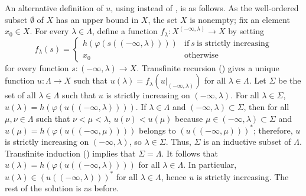\documentclass{article}
\begin{document}
\begin{solution}[\ref{exe:k8tmok20}]
  An alternative definition of \(u\), using 
  instead of , is as follows.  As the well-ordered
  subset \(\emptyset\) of \(X\) has an upper bound in \(X\), the set
  \(X\) is nonempty; fix an element \(x_0 \in X\).  For every
  \(\lambda \in \Lambda\), define a function
  \(f_\lambda : X^{(-\infty, \lambda)} \to X\) by setting
  \begin{displaymath}
    f_\lambda(s) =
    \begin{cases}
      h(\varphi(s((-\infty, \lambda))))
      & \text{if} ~ s ~ \text{is strictly increasing} \\
      x_0
      &
        \text{otherwise}
    \end{cases}
  \end{displaymath}
  for every function \(s : (-\infty, \lambda) \to X\).  Transfinite
  recursion () gives a unique function
  \(u : \Lambda \to X\) such that
  \(u(\lambda) = f_\lambda(u \vert_{(-\infty, \lambda)})\) for all
  \(\lambda \in \Lambda\).  Let \(\Sigma\) be the set of all
  \(\lambda \in \Lambda\) such that \(u\) is strictly increasing on
  \((-\infty, \lambda)\).  For all \(\lambda \in \Sigma\),
  \(u(\lambda) = h(\varphi(u((-\infty, \lambda))))\).  If
  \(\lambda \in \Lambda\) and \((-\infty, \lambda) \subset \Sigma\),
  then for all \(\mu, \nu \in \Lambda\) such that
  \(\nu < \mu < \lambda\), \(u(\nu) < u(\mu)\) because
  \(\mu \in (-\infty, \lambda) \subset \Sigma\) and
  \(u(\mu) = h(\varphi(u((-\infty, \mu))))\) belongs to
  \((u((-\infty, \mu)))^*\); therefore, \(u\) is strictly increasing
  on \((-\infty, \lambda)\), so \(\lambda \in \Sigma\).  Thus,
  \(\Sigma\) is an inductive subset of \(\Lambda\).  Transfinite
  induction () implies that \(\Sigma = \Lambda\).
  It follows that \(u(\lambda) = h(\varphi(u((-\infty, \lambda))))\)
  for all \(\lambda \in \Lambda\).  In particular,
  \(u(\lambda) \in (u((-\infty, \lambda)))^*\) for all
  \(\lambda \in \Lambda\), hence \(u\) is strictly increasing.  The
  rest of the solution is as before.
\end{solution}
\end{document}
